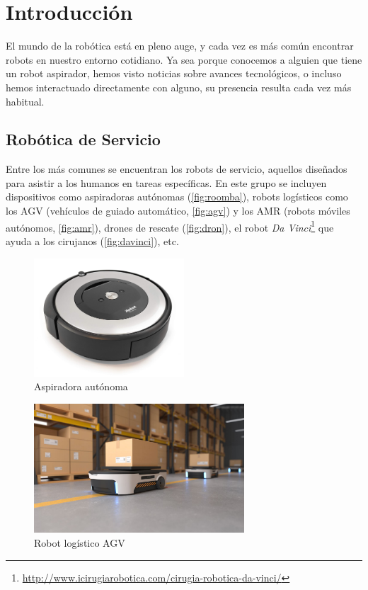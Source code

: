 \chapter{Introducción}\label{cap:introduccion}

El mundo de la robótica está en pleno auge, y cada vez es más común encontrar robots en nuestro entorno cotidiano. Ya sea porque conocemos a alguien que tiene un robot aspirador, hemos visto noticias sobre avances tecnológicos, o incluso hemos interactuado directamente con alguno, su presencia resulta cada vez más habitual.

\section{Robótica de Servicio}

Entre los más comunes se encuentran los robots de servicio, aquellos diseñados para asistir a los humanos en tareas específicas. En este grupo se incluyen dispositivos como aspiradoras autónomas (\autoref{fig:roomba}), robots logísticos como los AGV (vehículos de guiado automático, \autoref{fig:agv}) y los AMR (robots móviles autónomos, \autoref{fig:amr}), drones de rescate (\autoref{fig:dron}), el robot \textit{Da Vinci}\footnote{\url{http://www.icirugiarobotica.com/cirugia-robotica-da-vinci/}} que ayuda a los cirujanos (\autoref{fig:davinci}), etc.

\begin{figure}[H]
    \centering
    \includegraphics[width=0.5\textwidth]{figures/cap_1/roomba.jpg}
    \caption{Aspiradora autónoma}
    \label{fig:roomba}
\end{figure}

\begin{figure}[H]
    \centering
    \includegraphics[width=0.7\textwidth]{figures/cap_1/agv.jpeg}
    \caption{Robot logístico AGV}
    \label{fig:agv}
\end{figure}

